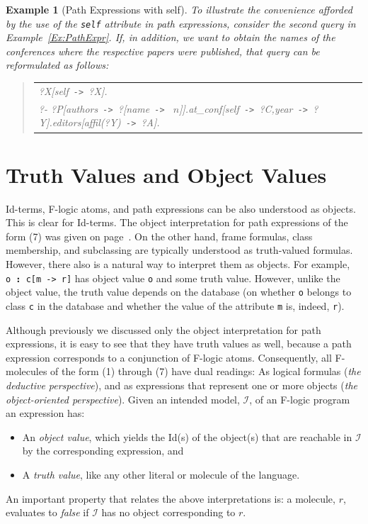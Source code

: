 \documentclass[11pt]{article}
\newtheorem{example}{Example}[section]
\newenvironment{qrules}{\begin{quote}\tt\begin{tabular}[t]{l}}%
{\end{tabular}\end{quote}}
\newcommand{\db}[1]{\ensuremath{\mathcal{#1}}}
\newcommand{\isa}{\,{\bf{:}}\,}
\newcommand{\mvd}{{\mbox{\tt \,->\,}}}  %
\newcommand{\anon}{?}
\newcommand{\fl}{\mbox{F-logic}\xspace}
\begin{document}
\begin{example}[Path Expressions with \textsf{self}]\label{ex-path-self}
  \rm{
    To illustrate the convenience afforded by the use of the {\tt self}
    attribute in path expressions, consider the second query in
    Example~\ref{Ex:PathExpr}. If, in addition, we want to obtain the names
    of the conferences where the respective papers were published, that
    query can be reformulated as follows:
    }
  \begin{qrules}
    \hspace*{-12mm}
    ?X[self\mvd ?X].\\
    \hspace*{-12mm}
    ?- ?P[authors\mvd\anon[name\mvd
    $n$]].at\_conf[self\mvd ?C,year\mvd ?Y].editors[affil(?Y)\mvd ?A]. 
  \end{qrules}
\end{example}



\section{Truth Values and Object Values}
\label{sec-references}


Id-terms, \fl atoms, and path expressions can be also understood as
objects. This is clear for Id-terms. The object interpretation for path
expressions of the form (7) was given on page~\pageref{eq-path-fun}.
On the other hand, frame formulas, class membership, and subclassing
are typically understood as truth-valued formulas.
However, there
also is a natural way to interpret them as objects.  For example,
{\tt o{\isa}c[m{\mvd}r]} has object value {\tt o} and some truth value.
However, unlike the object value, the truth value depends on the database
(on whether {\tt o} belongs to class {\tt c} in the database and whether
the value of the attribute {\tt m} is, indeed, {\tt r}).

Although previously we discussed only the object interpretation for path
expressions, it is easy to see that they have truth values as well, because
a path expression corresponds to a conjunction of F-logic atoms.
Consequently, all F-molecules of the form (1) through (7) have dual
readings: As logical formulas (\emph{the deductive perspective}), and as
expressions that represent one or more objects (\emph{the object-oriented
  perspective}).  Given an intended model, \db I, of an \fl program an
expression has:
\begin{itemize}
\item An \emph{object value}, which yields the Id(s) of the object(s)
  that are reachable in \db I by the corresponding expression, and 
\item A \emph{truth value}, like any other literal or molecule of the
  language. 
\end{itemize}
An important property that relates the above interpretations is: a
molecule, $r$, evaluates to \emph{false} if \db I has no object
corresponding to $r$.
\end{document}
